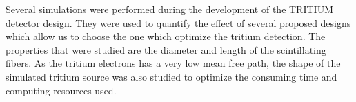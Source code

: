 Several simulations were performed during the development of the TRITIUM detector design. They were used to quantify the effect of several proposed designs which allow us to choose the one which optimize the tritium detection. The properties that were studied are the diameter and length of the scintillating fibers. As the tritium electrons has a very low mean free path, the shape of the simulated tritium source was also studied to optimize the consuming time and computing resources used. 

